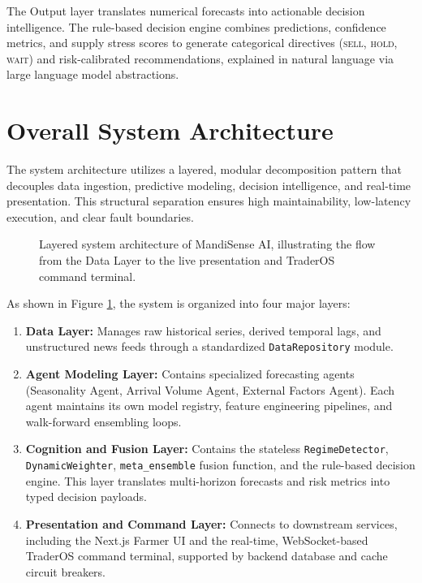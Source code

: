 \documentclass[12pt,a4paper]{report}
\theoremstyle{definition}
\theoremstyle{remark}
\begin{document}
The Output layer translates numerical forecasts into actionable decision intelligence. The rule-based decision engine combines predictions, confidence metrics, and supply stress scores to generate categorical directives (\textsc{sell}, \textsc{hold}, \textsc{wait}) and risk-calibrated recommendations, explained in natural language via large language model abstractions.

\section{Overall System Architecture}

The system architecture utilizes a layered, modular decomposition pattern that decouples data ingestion, predictive modeling, decision intelligence, and real-time presentation. This structural separation ensures high maintainability, low-latency execution, and clear fault boundaries.

\begin{figure}[htbp]
    \centering
    \caption{Layered system architecture of MandiSense AI, illustrating the flow from the Data Layer to the live presentation and TraderOS command terminal.}
    \label{fig:system_architecture}
\end{figure}

As shown in Figure \ref{fig:system_architecture}, the system is organized into four major layers:
\begin{enumerate}
    \item \textbf{Data Layer:} Manages raw historical series, derived temporal lags, and unstructured news feeds through a standardized \texttt{DataRepository} module.
    \item \textbf{Agent Modeling Layer:} Contains specialized forecasting agents (Seasonality Agent, Arrival Volume Agent, External Factors Agent). Each agent maintains its own model registry, feature engineering pipelines, and walk-forward ensembling loops.
    \item \textbf{Cognition and Fusion Layer:} Contains the stateless \texttt{RegimeDetector}, \texttt{DynamicWeighter}, \texttt{meta\_ensemble} fusion function, and the rule-based decision engine. This layer translates multi-horizon forecasts and risk metrics into typed decision payloads.
    \item \textbf{Presentation and Command Layer:} Connects to downstream services, including the Next.js Farmer UI and the real-time, WebSocket-based TraderOS command terminal, supported by backend database and cache circuit breakers.
\end{enumerate}
\end{document}
